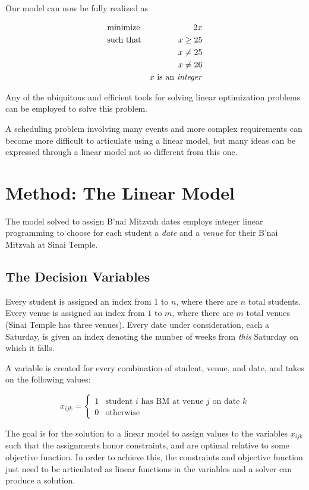\documentclass[11pt]{article}
\begin{document}
Our model can now be fully realized as

\begin{align*}
&\text{minimize} &2x\\
&\text{such that} & x \ge 25\\
&& x\ne 25\\
&& x\ne 26\\
&& x \text{ is an \emph{integer}}
\end{align*}

Any of the ubiquitous and efficient tools for solving linear optimization problems can be employed to solve this problem.

A scheduling problem involving many events and more complex requirements can become more difficult to articulate using a linear model, but many ideas can be expressed through a linear model not so different from this one.


\section{Method: The Linear Model}
The model solved to assign B'nai Mitzvah dates employs integer linear programming to choose for each student a \emph{date} and a \emph{venue} for their B'nai Mitzvah at Sinai Temple.

\subsection{The Decision Variables}


Every student is assigned an index from $1$ to $n$, where there are $n$ total students. Every venue is assigned an index from $1$ to $m$, where there are $m$ total venues (Sinai Temple has three venues). Every date under consideration, each a Saturday, is given an index denoting the number of weeks from \emph{this} Saturday on which it falls.

A variable is created for every combination of student, venue, and date, and takes on the following values:

\begin{equation}\label{x}
x_{ijk}=
\begin{cases} 
      1 & \text{student $i$ has BM at venue $j$ on date $k$} \\
      0 & \text{otherwise}
   \end{cases}
\end{equation}

The goal is for the solution to a linear model to assign values to the variables $x_{ijk}$ such that the assignments honor constraints, and are optimal relative to some objective function. In order to achieve this, the constraints and objective function just need to be articulated as linear functions in the variables and a solver can produce a solution.
\end{document}
